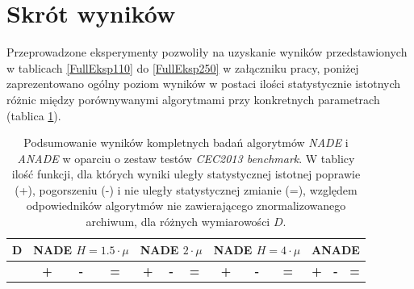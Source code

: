 \documentclass[12pt,a4paper]{report}
\begin{document}
{{{{{{\section{Skrót wyników}
\par{
Przeprowadzone eksperymenty pozwoliły na uzyskanie wyników przedstawionych w tablicach \ref{FullEksp110} do \ref{FullEksp250} w załączniku pracy, poniżej zaprezentowano ogólny poziom wyników w postaci ilości statystycznie istotnych różnic między porównywanymi algorytmami przy konkretnych parametrach (tablica \ref{FULLSUMMARY}).
}

\begin{table}[h]
\centering
\caption{Podsumowanie wyników kompletnych badań algorytmów \emph{NADE} i \emph{ANADE} w oparciu o zestaw testów \emph{CEC2013 benchmark}. W tablicy ilość funkcji, dla których wyniki uległy statystycznej istotnej poprawie (+), pogorszeniu (-) i nie uległy statystycznej zmianie (=), względem odpowiedników algorytmów nie zawierającego znormalizowanego archiwum, dla różnych wymiarowości $D$.}
\label{FULLSUMMARY}
\begin{tabular}{|c|c|c|c|c|c|c|c|c|c|c|c|c|}
\hline
{\bf D}  & \multicolumn{3}{c|}{{\bf NADE $H=1.5 \cdot \mu$}} & \multicolumn{3}{c|}{{\bf NADE $2 \cdot \mu$}} & \multicolumn{3}{c|}{{\bf NADE $H=4 \cdot \mu$}} & \multicolumn{3}{c|}{{\bf ANADE}} \\ \hline
         & {\bf\hspace{3mm}+\hspace{3mm}}       & {\bf\hspace{4mm}-\hspace{4mm}}      & {\bf\hspace{1mm}=\hspace{1mm}}      & {\bf\hspace{1mm}+\hspace{1mm}}       & {\bf\hspace{1mm}-\hspace{1mm}}       & {\bf\hspace{1mm}=}       & {\bf\hspace{2mm}+\hspace{2mm}}        & {\bf\hspace{3mm}-\hspace{3mm}}        & {\bf\hspace{1mm}=\hspace{1mm}}       & {\bf\hspace{1mm}+\hspace{1mm}}   & {\bf\hspace{1mm}-\hspace{1mm}}   & {\bf\hspace{1mm}=\hspace{1mm}}  \\ \hline

\end{tabular}
\end{table}}}}}}}
\end{document}

